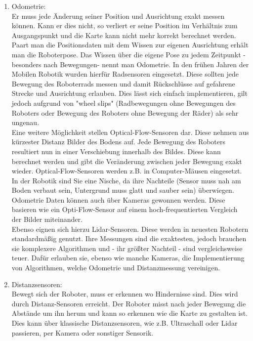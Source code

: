 \documentclass[twoside,11pt, a4paper]{report}
\begin{document}
	\begin{enumerate}
		\item Odometrie:\\
		Er muss jede Änderung seiner Position und Ausrichtung exakt messen können. Kann er dies nicht, so verliert er seine Position im Verhältnis zum Ausgangspunkt und die Karte kann nicht mehr korrekt berechnet werden. Paart man die Positionsdaten mit dem Wissen zur eigenen Ausrichtung erhält man die Roboterpose. Das Wissen über die eigene Pose zu jedem Zeitpunkt - besonders nach Bewegungen-  nennt man Odometrie. In den frühen Jahren der Mobilen Robotik wurden hierfür Radsensoren eingesetzt. Diese sollten jede Bewegung des Roboterrads messen und damit Rückschlüsse auf gefahrene Strecke und Ausrichtung erlauben. Dies lässt sich einfach implementieren, gilt jedoch aufgrund von "wheel slips" (Radbewegungen ohne Bewegungen des Roboters oder Bewegung des Roboters ohne Bewegung der Räder) als sehr ungenau. \\
		Eine weitere Möglichkeit stellen Optical-Flow-Sensoren dar. Diese nehmen aus kürzester Distanz Bilder des Bodens auf. Jede Bewegung des Roboters resultiert nun in einer Verschiebung innerhalb des Bildes. Diese kann berechnet werden und gibt die Veränderung zwischen jeder Bewegung exakt wieder. Optical-Flow-Sensoren werden z.B. in Computer-Mäusen eingesetzt. In der Robotik sind Sie eine Nische, da ihre Nachteile (Sensor muss nah am Boden verbaut sein, Untergrund muss glatt und sauber sein) überwiegen. \\
		Odometrie Daten können auch über Kameras gewonnen werden. Diese basieren wie ein Opti-Flow-Sensor auf einem hoch-frequentierten Vergleich der Bilder miteinander. \\
		Ebenso eignen sich hierzu Lidar-Sensoren. Diese werden in neuesten Robotern standardmäßig genutzt. Ihre Messungen sind die exaktesten, jedoch brauchen sie komplexere Algorithmen und - ihr größter Nachteil - sind vergleichsweise teuer. Dafür erlauben sie, ebenso wie manche Kameras, die Implementierung von Algorithmen, welche Odometrie und Distanzmessung vereinigen. 
		\item Distanzsensoren:\\
		Bewegt sich der Roboter, muss er erkennen wo Hindernisse sind. Dies wird durch Distanz-Sensoren erreicht. Der Roboter misst nach jeder Bewegung die Abstände um ihn herum und kann so erkennen wie die Karte zu gestalten ist. Dies kann über klassische Distanzsensoren, wie z.B. Ultraschall oder Lidar passieren, per Kamera oder sonstiger Sensorik. 
	\end{enumerate}
	
\end{document}
